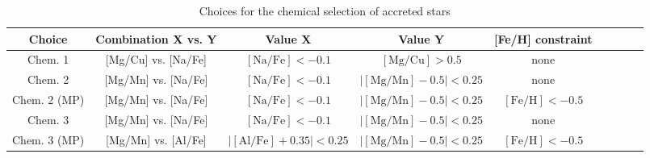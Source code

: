 \begin{table*}
\centering
\caption{Choices for the chemical selection of accreted stars}
\label{tab:chemical_choices}
\begin{tabular}{ccccccccc}
\hline \hline
Choice		&	Combination X vs. Y		&	Value X								&	Value Y							&	[Fe/H] constraint		\\
\hline
Chem. 1		&	[Mg/Cu] vs. [Na/Fe]		&	$\mathrm{[Na/Fe]} < -0.1$					& $\mathrm{[Mg/Cu]} > 0.5$				&	none					\\
Chem. 2		&	[Mg/Mn] vs. [Na/Fe]		&	$\mathrm{[Na/Fe]} < -0.1$					& $\vert \mathrm{[Mg/Mn]} - 0.5 \vert < 0.25$	&	none					\\
Chem. 2 (MP)	&	[Mg/Mn] vs. [Na/Fe]		&	$\mathrm{[Na/Fe]} < -0.1$					& $\vert \mathrm{[Mg/Mn]} - 0.5 \vert < 0.25$	&	$\mathrm{[Fe/H]} < -0.5$	\\	
Chem. 3		&	[Mg/Mn] vs. [Na/Fe]		&	$\mathrm{[Na/Fe]} < -0.1$					& $\vert \mathrm{[Mg/Mn]} - 0.5 \vert < 0.25$	&	none					\\	
Chem. 3 (MP)	&	[Mg/Mn] vs. [Al/Fe]		&	$\vert \mathrm{[Al/Fe]} +0.35 \vert< 0.25$		& $\vert \mathrm{[Mg/Mn]} - 0.5 \vert < 0.25$	&	$\mathrm{[Fe/H]} < -0.5$	\\	
   \hline
\end{tabular}
\end{table*}
